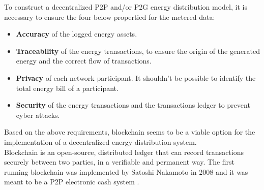 To construct a decentralized P2P and/or P2G energy distribution model, it is necessary to ensure the four below propertied for the metered data:
\begin{itemize}
\item \textbf{Accuracy} of the logged energy assets.
\item \textbf{Traceability} of the energy transactions, to ensure the origin of the generated energy and the correct flow of transactions.
\item \textbf{Privacy} of each network participant. It shouldn't be possible to identify the total energy bill of a participant.
\item \textbf{Security} of the energy transactions and the transactions ledger to prevent cyber attacks. \cite{Vangulick2023}
\end{itemize}
Based on the above requirements, blockchain seems to be a viable option for the implementation of a decentralized energy distribution system.\\
Blockchain is an open-source, distributed ledger that can record transactions securely
between two parties, in a verifiable and permanent way. The first running blockchain was implemented by Satoshi Nakamoto in 2008
and it was meant to be a P2P electronic cash system \cite{Nakamoto}.